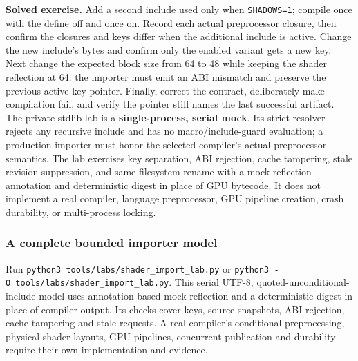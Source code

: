 \textbf{Solved exercise.} Add a second include used only when \texttt{SHADOWS=1}; compile once with the define off and once on. Record each actual preprocessor closure, then confirm the closures and keys differ when the additional include is active. Change the new include's bytes and confirm only the enabled variant gets a new key. Next change the expected block size from 64 to 48 while keeping the shader reflection at 64: the importer must emit an ABI mismatch and preserve the previous active-key pointer. Finally, correct the contract, deliberately make compilation fail, and verify the pointer still names the last successful artifact. The private stdlib lab is a \textbf{single-process, serial mock}. Its strict resolver rejects any recursive include and has no macro/include-guard evaluation; a production importer must honor the selected compiler's actual preprocessor semantics. The lab exercises key separation, ABI rejection, cache tampering, stale revision suppression, and same-filesystem rename with a mock reflection annotation and deterministic digest in place of GPU bytecode. It does not implement a real compiler, language preprocessor, GPU pipeline creation, crash durability, or multi-process locking.

\subsubsection{A complete bounded importer model}\label{05-engine-i-ch010-a-complete-bounded-importer-model}

Run \texttt{python3\ tools/labs/shader\_import\_lab.py} or \texttt{python3\ -O\ tools/labs/shader\_import\_lab.py}. This serial UTF-8, quoted-unconditional-include model uses annotation-based mock reflection and a deterministic digest in place of compiler output. Its checks cover keys, source snapshots, ABI rejection, cache tampering and stale requests. A real compiler's conditional preprocessing, physical shader layouts, GPU pipelines, concurrent publication and durability require their own implementation and evidence.

